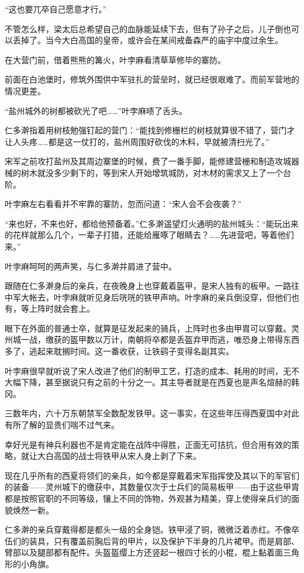 “这也要兀卒自己愿意才行。”

不管怎么样，梁太后总希望自己的血脉能延续下去，但有了孙子之后，儿子倒也可以丢掉了。当今大白高国的皇帝，或许会在某间戒备森严的庙宇中度过余生。

在大营门前，借着熊熊的篝火，叶孛麻看清草草修毕的寨防。

前面在白池堡时，修筑外围供中军驻扎的营垒时，就已经很艰难了。而前军营地的情况更差。

“盐州城外的树都被砍光了吧……”叶孛麻啧了舌头。

仁多澣指着用树枝勉强钉起的营门：“能找到修栅栏的树枝就算很不错了，营门才让人头疼……都是这一仗打的，盐州周围好砍伐的木料，早就被清扫光了。”

宋军之前攻打盐州及其周边寨堡的时候，费了一番手脚，能修建营栅和制造攻城器械的树木就没多少剩下的，等到宋人开始增筑城防，对木材的需求又上了一个台阶。

叶孛麻左右看看并不牢靠的寨防，忽而问道：“宋人会不会夜袭？”

“来也好，不来也好，都给他预备着。”仁多澣遥望灯火通明的盐州城头：“能玩出来的花样就那么几个，一辈子打猎，还能给雁啄了眼睛去？……先进营吧，等着他们来。”

叶孛麻呵呵的两声笑，与仁多澣并肩进了营中。

跟随在仁多澣身后的亲兵，在夜晚身上也穿戴着盔甲，是宋人独有的板甲。一路往中军大帐去，叶孛麻就听见身后咣咣的铁甲声响。叶孛麻的亲兵倒没穿，但他们也有，等上阵时就会套上。

眼下在外面的普通士卒，就算是征发起来的骑兵，上阵时也多由甲胄可以穿戴。灵州城一战，缴获的盔甲数以万计，南朝将卒都是丢盔弃甲而逃，唯恐身上带得东西多了，逃起来耽搁时间。这一番收获，让铁鹞子变得名副其实。

叶孛麻很早就听说了宋人改进了他们的制甲工艺，打造的成本、耗用的时间，无不大幅下降，甚至据说只有之前的十分之一。其主导者就是在西夏也是声名煊赫的韩冈。

三数年内，六十万东朝禁军全数配发铁甲。这一事实，在这些年压得西夏国中对此有所了解的显贵们喘不过气来。

幸好光是有神兵利器也不是肯定能在战阵中得胜，正面无可拮抗，但合用有效的策略，就让大白高国的战士将铁甲从宋人身上剥了下来。

现在几乎所有的西夏将领们的亲兵，如今都是穿戴着宋军指挥使及其以下的军官们的装备——灵州城下的缴获中，其数量仅次于士兵们的简易板甲——由于这些甲胄都是按照官职的不同等级，镶上不同的饰物，外观甚为精美，穿上使得亲兵们的面貌焕然一新。

仁多澣的亲兵穿戴得都是都头一级的全身铠。铁甲浸了铜，微微泛着赤红。不像卒伍们的装具，只有覆盖前胸后背的甲片，以及保护下半身的几片裙甲。而是肩部、臂部以及腿部都有配件。头盔盔缨上方还竖起一根四寸长的小棍，棍上黏着面三角形的小角旗。

